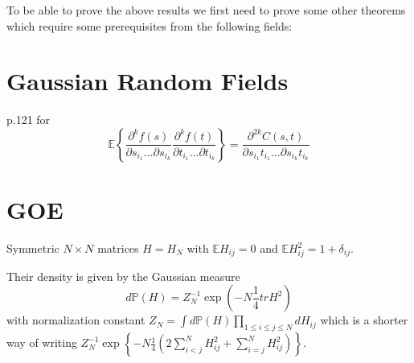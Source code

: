 To be able to prove the above results we first need to prove some other theorems which require some prerequisites from the following fields:

\section{Gaussian Random Fields}
\cite{Adler07} p.121 for \begin{equation}
	\mathbb E\left\{\frac{\partial^k f(s)}{\partial s_{i_1}\dots\partial s_{i_k}} \frac{\partial^k f(t)}{\partial t_{i_1}\dots\partial t_{i_k}}\right\}=\frac{\partial^{2k} C(s,t)}{\partial s_{i_1}t_{i_1}\dots\partial s_{i_k}t_{i_k}}
\end{equation}

\section{GOE}
\begin{definition}
	Symmetric $N\times N$ matrices $H=H_N$ with $\mathbb E H_{ij}=0$ and $\mathbb E H_{ij}^2=1+\delta_{ij}$.
\end{definition}
\begin{remark}
	Their density is given by the Gaussian measure
	\begin{equation}
		d\mathbb P(H)=Z_N^{-1}\exp\left(-N\frac{1}{4}tr H^2\right)
	\end{equation}
	with normalization constant $Z_N=\int d\mathbb P(H)\prod_{1\leq i\leq j\leq N} dH_{ij}$ which is a shorter way of writing $Z_N^{-1}\exp\left\{-N\frac{1}{4}\left(2\sum_{i<j}^N H_{ij}^2+\sum_{i=j}^N H_{ij}^2\right)\right\}$.
\end{remark}

